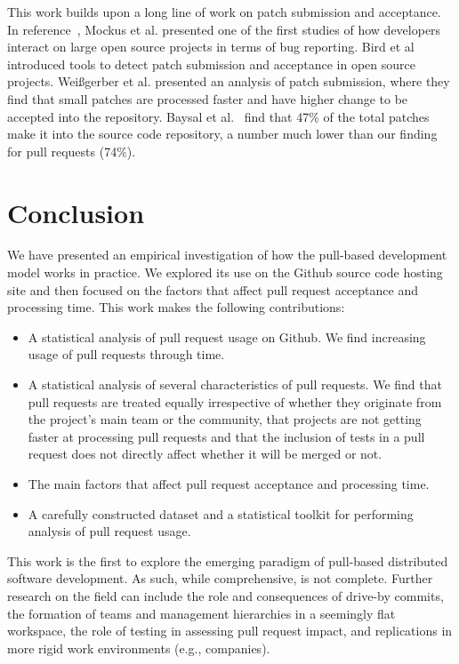 \documentclass{sig-alternate}
\begin{document}
This work builds upon a long line of work on patch submission and acceptance.
In reference~\cite{MOCKU02}, Mockus et al. presented one of the first studies of
how developers interact on large open source projects in terms of bug reporting.
Bird et al~\cite{Bird07a} introduced tools to detect patch submission and
acceptance in open source projects. Wei\ss gerber et al. presented an analysis
of patch submission, where they find that small patches are processed faster and
have higher change to be accepted into the repository. Baysal et
al.~\cite{Baysa12} find that 47\% of the total patches make it into the source
code repository, a number much lower than our finding for pull requests (74\%).

\section{Conclusion}

We have presented an empirical investigation of how the pull-based development
model works in practice. We explored its use on the Github source code
hosting site and then focused on the factors that affect pull request acceptance
and processing time. This work makes the following contributions:

\begin{itemize}

  \item A statistical analysis of pull request usage on Github.
    We find increasing usage of pull requests through time.

  \item A statistical analysis of several characteristics of pull requests.
    We find that pull requests are treated equally irrespective of whether they
    originate from the project's main team or the community, that projects
    are not getting faster at processing pull requests and that the inclusion of
    tests in a pull request does not directly affect whether it will be merged or not.

  \item The main factors that affect pull request acceptance and
    processing time. 

  \item A carefully constructed dataset and a statistical toolkit for
    performing analysis of pull request usage.

\end{itemize}


This work is the first to explore the emerging paradigm of pull-based
distributed software development. As such, while comprehensive, is not complete.
Further research on the field can include the role and consequences of drive-by
commits, the formation of teams and management hierarchies in a seemingly flat
workspace, the role of testing in assessing pull request impact, and
replications in more rigid work environments (e.g., companies).
\end{document}
